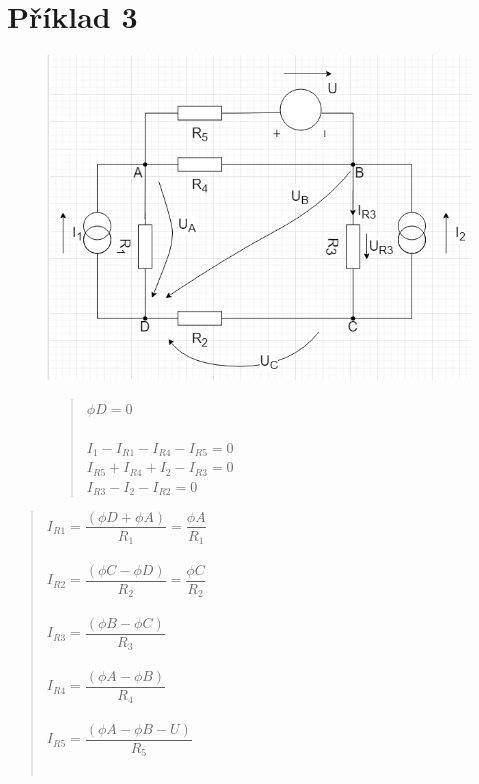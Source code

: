\section{Příklad 3}


\begin{figure}[H]
    \centering
    \includegraphics[scale=0.5]{picturesFor3Uloha/1.png}
    \begin{quote}
        \centering
	   $\phi D = 0$ \\~\\
	   $I_1 - I_{R1} - I_{R4} - I_{R5} = 0$ \\
	   $I_{R5} + I_{R4} + I_2 - I_{R3} = 0$ \\
	   $I_{R3} - I_2 - I_{R2} = 0$ \\
    \end{quote}
\end{figure}

\newpage
\begin{quote}
    \centering
    $I_{R1} = \dfrac{(\phi D + \phi A)}{R_1} = \dfrac{\phi A}{R_1} $ \\~\\
    $I_{R2} = \dfrac{(\phi C - \phi D)}{R_2} = \dfrac{\phi C}{R_2} $ \\~\\
    $I_{R3} = \dfrac{(\phi B - \phi C)}{R_3} $ \\~\\
    $I_{R4} = \dfrac{(\phi A - \phi B)}{R_4} $ \\~\\
    $I_{R5} = \dfrac{(\phi A - \phi B - U)}{R_5} $ \\~\\ 
\end{quote}


